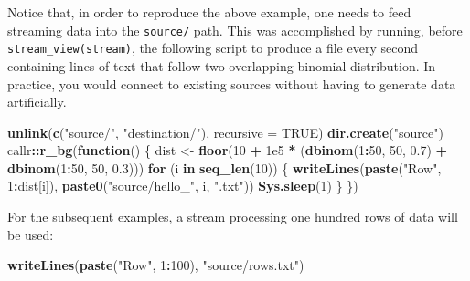 \documentclass[]{book}
\newenvironment{Shaded}{\begin{snugshade}}{\end{snugshade}}
\newcommand{\ControlFlowTok}[1]{\textcolor[rgb]{0.13,0.29,0.53}{\textbf{#1}}}
\newcommand{\DataTypeTok}[1]{\textcolor[rgb]{0.13,0.29,0.53}{#1}}
\newcommand{\DecValTok}[1]{\textcolor[rgb]{0.00,0.00,0.81}{#1}}
\newcommand{\FloatTok}[1]{\textcolor[rgb]{0.00,0.00,0.81}{#1}}
\newcommand{\KeywordTok}[1]{\textcolor[rgb]{0.13,0.29,0.53}{\textbf{#1}}}
\newcommand{\NormalTok}[1]{#1}
\newcommand{\OperatorTok}[1]{\textcolor[rgb]{0.81,0.36,0.00}{\textbf{#1}}}
\newcommand{\OtherTok}[1]{\textcolor[rgb]{0.56,0.35,0.01}{#1}}
\newcommand{\StringTok}[1]{\textcolor[rgb]{0.31,0.60,0.02}{#1}}
\theoremstyle{definition}
\theoremstyle{definition}
\theoremstyle{definition}
\theoremstyle{remark}
\begin{document}
Notice that, in order to reproduce the above example, one needs to feed
streaming data into the \texttt{source/} path. This was accomplished by
running, before \texttt{stream\_view(stream)}, the following script to
produce a file every second containing lines of text that follow two
overlapping binomial distribution. In practice, you would connect to
existing sources without having to generate data artificially.

\begin{Shaded}
\begin{Highlighting}[]
\KeywordTok{unlink}\NormalTok{(}\KeywordTok{c}\NormalTok{(}\StringTok{"source/"}\NormalTok{, }\StringTok{"destination/"}\NormalTok{), }\DataTypeTok{recursive =} \OtherTok{TRUE}\NormalTok{)}
\KeywordTok{dir.create}\NormalTok{(}\StringTok{"source"}\NormalTok{)}
\NormalTok{callr}\OperatorTok{::}\KeywordTok{r_bg}\NormalTok{(}\ControlFlowTok{function}\NormalTok{() \{}
\NormalTok{  dist <-}\StringTok{ }\KeywordTok{floor}\NormalTok{(}\DecValTok{10} \OperatorTok{+}\StringTok{ }\FloatTok{1e5} \OperatorTok{*}\StringTok{ }\NormalTok{(}\KeywordTok{dbinom}\NormalTok{(}\DecValTok{1}\OperatorTok{:}\DecValTok{50}\NormalTok{, }\DecValTok{50}\NormalTok{, }\FloatTok{0.7}\NormalTok{) }\OperatorTok{+}\StringTok{ }\KeywordTok{dbinom}\NormalTok{(}\DecValTok{1}\OperatorTok{:}\DecValTok{50}\NormalTok{, }\DecValTok{50}\NormalTok{, }\FloatTok{0.3}\NormalTok{)))}
  \ControlFlowTok{for}\NormalTok{ (i }\ControlFlowTok{in} \KeywordTok{seq_len}\NormalTok{(}\DecValTok{10}\NormalTok{)) \{}
    \KeywordTok{writeLines}\NormalTok{(}\KeywordTok{paste}\NormalTok{(}\StringTok{"Row"}\NormalTok{, }\DecValTok{1}\OperatorTok{:}\NormalTok{dist[i]), }\KeywordTok{paste0}\NormalTok{(}\StringTok{"source/hello_"}\NormalTok{, i, }\StringTok{".txt"}\NormalTok{))}
    \KeywordTok{Sys.sleep}\NormalTok{(}\DecValTok{1}\NormalTok{)}
\NormalTok{  \}}
\NormalTok{\})}
\end{Highlighting}
\end{Shaded}

For the subsequent examples, a stream processing one hundred rows of
data will be used:

\begin{Shaded}
\begin{Highlighting}[]
\KeywordTok{writeLines}\NormalTok{(}\KeywordTok{paste}\NormalTok{(}\StringTok{"Row"}\NormalTok{, }\DecValTok{1}\OperatorTok{:}\DecValTok{100}\NormalTok{), }\StringTok{"source/rows.txt"}\NormalTok{)}
\end{Highlighting}
\end{Shaded}
\end{document}
